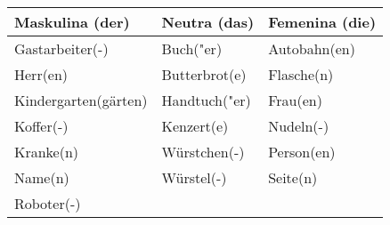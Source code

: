 \documentclass{article}
\renewcommand{\arraystretch}{1}
\begin{document}
\begin{table}[h!]
    \centering
    \label{tab:tabla1}
    \renewcommand{\arraystretch}{1.5}
    \begin{tabular}{|>{\raggedright\arraybackslash}p{5cm}|>{\raggedright\arraybackslash}p{5cm}|>{\raggedright\arraybackslash}p{5cm}|}
        \hline
        \rowcolor{gray!20} \textbf{Maskulina (der)} & \textbf{Neutra (das)} & \textbf{Femenina (die)} \\
        \hline
        Gastarbeiter(-) & Buch("er) & Autobahn(en) \\\hline
        Herr(en) & Butterbrot(e) & Flasche(n) \\\hline
        Kindergarten(gärten) & Handtuch("er) & Frau(en) \\\hline
        Koffer(-) & Kenzert(e) & Nudeln(-) \\\hline
        Kranke(n) & Würstchen(-) & Person(en) \\\hline
        Name(n) & Würstel(-) & Seite(n) \\\hline
        Roboter(-) &  &  \\\hline
    \end{tabular}
\end{table}
\end{document}
